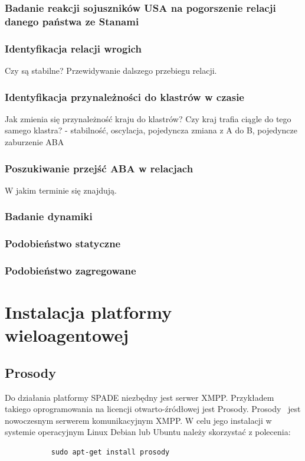 \documentclass[11pt]{report}
\begin{document}
    \subsection{Badanie reakcji sojuszników USA na pogorszenie relacji danego państwa ze Stanami}

    \subsection{Identyfikacja relacji wrogich}
    Czy są stabilne?
    Przewidywanie dalszego przebiegu relacji.

    \subsection{Identyfikacja przynależności do klastrów w czasie}
    Jak zmienia się przynależność kraju do klastrów?
    Czy kraj trafia ciągle do tego samego klastra?
    - stabilność, oscylacja, pojedyncza zmiana z A do B, pojedyncze zaburzenie ABA

    \subsection{Poszukiwanie przejść ABA w relacjach}
    W jakim terminie się znajdują.

    \subsection{Badanie dynamiki}

    \subsection{Podobieństwo statyczne}

    \subsection{Podobieństwo zagregowane}

    \newpage
    \printbibliography[title={Bibliografia}]

    \appendix
    \newpage


    \chapter{Instalacja platformy wieloagentowej}


    \section{Prosody}
    Do działania platformy SPADE niezbędny jest serwer XMPP\@.
    Przykładem takiego oprogramowania na licencji otwarto-źródłowej jest Prosody.
    Prosody~\cite{prosody} jest nowoczesnym serwerem komunikacyjnym XMPP\@.
    W celu jego instalacji w systemie operacyjnym Linux Debian lub Ubuntu należy skorzystać z polecenia:
    \begin{verbatim}
           sudo apt-get install prosody
    \end{verbatim}
\end{document}

